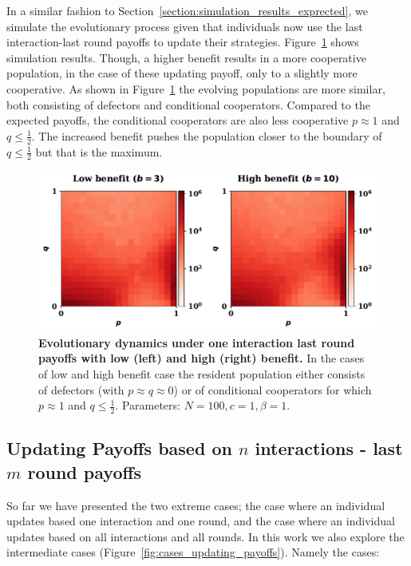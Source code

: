 \documentclass[11pt]{article}
\theoremstyle{plainCl1}
\theoremstyle{plainCl2}
\begin{document}
In a similar fashion to Section~\ref{section:simulation_results_exprected}, we
simulate the evolutionary process given that individuals now use the last
interaction-last round payoffs to update their strategies.
Figure~\ref{fig:one_interaction_last_round_payoffs_results} shows simulation
results. Though, a higher benefit results in a more cooperative population, in
the case of these updating payoff, only to a slightly more cooperative. As shown
in Figure~\ref{fig:one_interaction_last_round_payoffs_results} the evolving
populations are more similar, both consisting of defectors and conditional
cooperators. Compared to the expected payoffs, the conditional cooperators are
also less cooperative \(p \approx 1\) and \(q \leq \frac{1}{2}\). The increased
benefit pushes the population closer to the boundary of \(q \leq \frac{1}{2}\)
but that is the maximum.

\begin{figure}[!htbp]
  \centering 
  \includegraphics[width=.70\textwidth]{../static/one_interaction_last_round_payoffs_results}
  \caption{\textbf{Evolutionary dynamics under one interaction last round
  payoffs with low (left) and high (right) benefit.} In the cases of low and
  high benefit case the resident population either consists of defectors (with
  \(p \approx q \approx 0\)) or of conditional cooperators for which \(p \approx
  1\) and \(q \leq \frac{1}{2}\). Parameters: \(N =100, c=1, \beta=1\).
  }\label{fig:one_interaction_last_round_payoffs_results}
\end{figure}

\subsection{Updating Payoffs based on \(n\) interactions - last \(m\) round payoffs}

So far we have presented the two extreme cases; the case where an individual
updates based one interaction and one round, and the case  where an individual
updates based on all interactions and all rounds. In this work we also
explore the intermediate cases (Figure~\ref{fig:cases_updating_payoffs}). Namely the cases:
\end{document}
